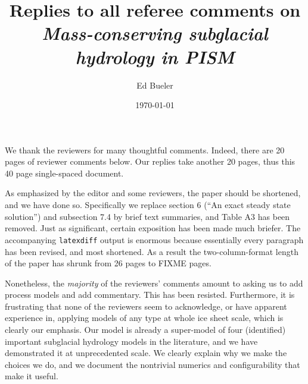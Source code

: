 \documentclass[11pt,reqno]{amsart}
\title[Replies to Referee Comments]{Replies to all referee comments on \\ \emph{Mass-conserving subglacial hydrology in PISM}}
\author{Ed Bueler}
\date{\today}
\begin{document}
\maketitle

\thispagestyle{empty}

We thank the reviewers for many thoughtful comments.  Indeed, there are 20 pages of reviewer comments below.  Our replies take another 20 pages, thus this 40 page single-spaced document.

As emphasized by the editor and some reviewers, the paper should be shortened, and we have done so.  Specifically we replace section 6 (``An exact steady state solution'') and subsection 7.4 by brief text summaries, and Table A3 has been removed.  Just as significant, certain exposition has been made much briefer.  The accompanying \texttt{latexdiff} output is enormous because essentially every paragraph has been revised, and most shortened.  As a result the two-column-format length of the paper has shrunk from 26 pages to FIXME pages.

Nonetheless, the \emph{majority} of the reviewers' comments amount to asking us to add process models and add commentary.  This has been resisted.  Furthermore, it is frustrating that none of the reviewers seem to acknowledge, or have apparent experience in, applying models of any type at whole ice sheet scale, which is clearly our emphasis.  Our model is already a super-model of four (identified) important subglacial hydrology models in the literature, and we have demonstrated it at unprecedented scale.  We clearly explain why we make the choices we do, and we document the nontrivial numerics and configurability that make it useful.
\end{document}
